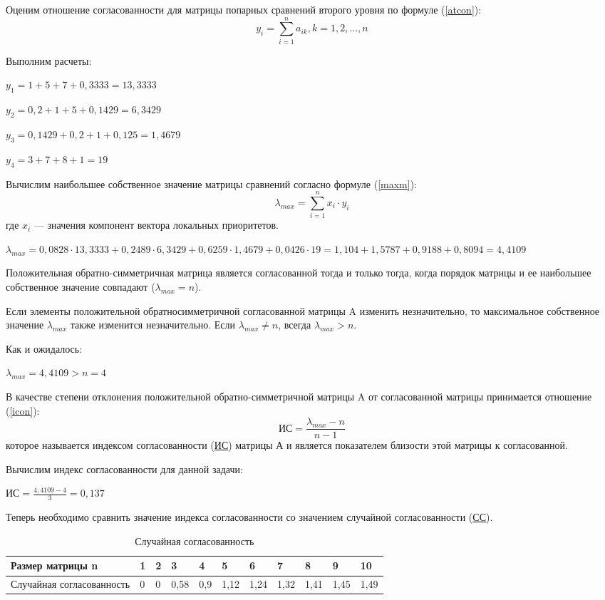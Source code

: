 Оценим отношение согласованности для матрицы попарных сравнений второго уровня по формуле (\ref{atcon}):
\begin{equation}\label{atcon}
y_i = \sum_{i=1}^{n} a_{ik}, k = 1,2,...,n
\end{equation}

Выполним расчеты:

$y_1 = 1 + 5 + 7 + 0,3333 = 13,3333$

$y_2 = 0,2 + 1 + 5 + 0,1429 = 6,3429$

$y_3 = 0,1429 + 0,2 + 1 + 0,125 = 1,4679$

$y_4 = 3 + 7 + 8 + 1 = 19$

Вычислим наибольшее собственное значение матрицы сравнений согласно формуле (\ref{maxm}):
\begin{equation}\label{maxm}
\lambda_{max} = \sum_{i=1}^{n} x_i \cdot y_i
\end{equation}
где $x_i$ --- значения компонент вектора локальных приоритетов.

$\lambda_{max} = 0,0828 \cdot 13,3333 + 0,2489 \cdot 6,3429 + 0,6259 \cdot 1,4679 + 0,0426 \cdot 19 = 1,104 + 1,5787 + 0,9188 + 0,8094  = 4,4109$

Положительная обратно-симметричная матрица является согласованной тогда и только тогда, когда порядок матрицы и ее наибольшее собственное значение совпадают ($\lambda_{max} = n$).

Если элементы положительной обратносимметричной согласованной матрицы A изменить незначительно, то максимальное собственное значение $\lambda_{max}$ также изменится незначительно.
Если $\lambda_{max} \neq n$, всегда $\lambda_{max} > n$.

Как и ожидалось:

$\lambda_{max} = 4,4109 > n = 4$

В качестве степени отклонения положительной обратно-симметричной матрицы A от согласованной матрицы принимается отношение (\ref{icon}):
\begin{equation}\label{icon}
\text{ИС} = \frac{\lambda_{max} - n}{n - 1}
\end{equation}
которое называется индексом согласованности (\hyperlink{is}{ИС}) матрицы А и является показателем близости этой матрицы к согласованной.

Вычислим индекс согласованности для данной задачи:

$\text{ИС} = \frac{4,4109 - 4}{3} = 0,137$

Теперь необходимо сравнить значение индекса согласованности со значением случайной согласованности (\hyperlink{ss}{СС}).
\begin{table}[H]
  \caption{Случайная согласованность}\label{randcon}
  \begin{tabular}{|p{4cm}|l|l|l|l|l|l|l|l|l|l|}
  \hline Размер матрицы n & 1 & 2 & 3 & 4 & 5 & 6 & 7 & 8 & 9 & 10 \\
  \hline Случайная согласованность & 0 & 0 & 0,58 & 0,9 & 1,12 & 1,24 & 1,32 & 1,41 & 1,45 & 1,49 \\
  \hline
  \end{tabular}
\end{table}

